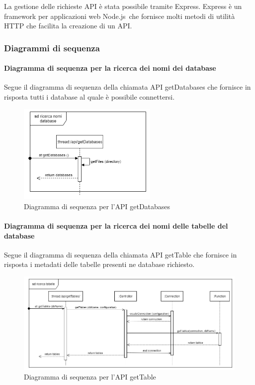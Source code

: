     La gestione delle richieste API è stata possibile tramite Express. Express è un framework per applicazioni web Node.js\glo\ che fornisce molti metodi di utilità HTTP che facilita la creazione di un API.
    
    \subsubsection{Diagrammi di sequenza}
    
    \paragraph{Diagramma di sequenza per la ricerca dei nomi dei database}
     Segue il diagramma di sequenza della chiamata API getDatabases che fornisce in risposta tutti i database al quale è possibile connettersi.
            \begin{figure}[H]
                \centering\includegraphics[width=0.6\textwidth]{source/img/API_getDatabases.png}
                \caption{Diagramma di sequenza per l'API getDatabases}
            \end{figure}
            \pagebreak

    \paragraph{Diagramma di sequenza per la ricerca dei nomi delle tabelle del database}
        Segue il diagramma di sequenza della chiamata API getTable che fornisce in risposta i metadati delle tabelle presenti ne database richiesto.
            \begin{figure}[H]
                \centering\includegraphics[width=1\textwidth]{source/img/API_getTable.png}
                \caption{Diagramma di sequenza per l'API getTable}
            \end{figure}
            
